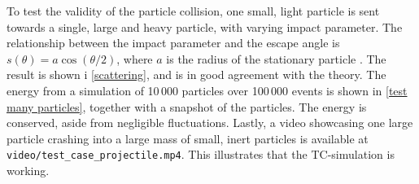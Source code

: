 \documentclass{article}
\begin{document}
    
    To test the validity of the particle collision, one small, light particle is sent towards a single, large and heavy particle, with varying impact parameter.
    The relationship between the impact parameter and the escape angle is $s(\theta) = a \cos(\theta / 2)$, where $a$ is the radius of the stationary particle \cite{klasmek}.
    The result is shown i \autoref{scattering}, and is in good agreement with the theory.
    The energy from a simulation of 10\,000 particles over 100\,000 events is shown in \autoref{test many particles}, together with a snapshot of the particles.
    The energy is conserved, aside from negligible fluctuations.
    Lastly, a video showcasing one large particle crashing into a large mass of small, inert particles is available at \verb|video/test_case_projectile.mp4|. This illustrates that the TC-simulation is working.
\end{document}
